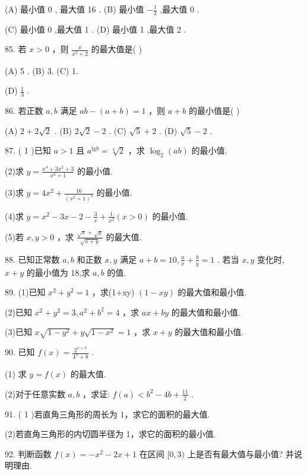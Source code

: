 \documentclass[10pt]{article}
\begin{document}
(A) 最小值 0 , 最大值 16 . (B) 最小值 \(- \frac{1}{3}\) ,最大值 0 .

(C) 最小值 0 ,最大值 1 . (D) 最小值 1 ,最大值 2 .

85. 若 \(x > 0\) ，则 \(\frac{x}{{x}^{3} + 2}\) 的最大值是( )

(A) 5 . (B) 3. (C) 1.

(D) \(\frac{1}{3}\) .

86. 若正数 \(a,b\) 满足 \({ab} - \left( {a + b}\right)  = 1\) ，则 \(a + b\) 的最小值是( )

(A) \(2 + 2\sqrt{2}\) . (B) \(2\sqrt{2} - 2\) . (C) \(\sqrt{5} + 2\) . (D) \(\sqrt{5} - 2\) .

87. ( 1 )已知 \(a > 1\) 且 \({a}^{\mathrm{{lg}}b} = \sqrt[4]{2}\) ，求 \({\log }_{2}\left( {ab}\right)\) 的最小值.

(2)求 \(y = \frac{{x}^{4} + 3{x}^{2} + 3}{{x}^{2} + 1}\) 的最小值.

(3)求 \(y = 4{x}^{2} + \frac{16}{{\left( {x}^{2} + 1\right) }^{2}}\) 的最小值.

(4)求 \(y = {x}^{2} - {3x} - 2 - \frac{3}{x} + \frac{1}{{x}^{2}}\left( {x > 0}\right)\) 的最小值.

(5)若 \(x,y > 0\) ，求 \(\frac{\sqrt{x} + \sqrt{y}}{\sqrt{x + y}}\) 的最大值.

88. 已知正常数 \(a,b\) 和正数 \(x,y\) 满足 \(a + b = {10},\frac{a}{x} + \frac{b}{y} = 1\) . 若当 \(x,y\) 变化时, \(x + y\) 的最小值为 18,求 \(a,b\) 的值.

89. (1)已知 \({x}^{2} + {y}^{2} = 1\) ，求(1+xy) \(\left( {1 - {xy}}\right)\) 的最大值和最小值.

(2)已知 \({x}^{2} + {y}^{2} = 3,{a}^{2} + {b}^{2} = 4\) ，求 \({ax} + {by}\) 的最大值和最小值.

(3)已知 \(x\sqrt{1 - {y}^{2}} + y\sqrt{1 - {x}^{2}} = 1\) ，求 \(x + y\) 的最大值和最小值.

90. 已知 \(f\left( x\right)  = \frac{{2}^{x + 3}}{{4}^{x} + 8}\) .

(1) 求 \(y = f\left( x\right)\) 的最大值.

(2)对于任意实数 \(a,b\) ，求证: \(f\left( a\right)  < {b}^{2} - {4b} + \frac{11}{2}\) .

91. ( 1 )若直角三角形的周长为 1，求它的面积的最大值.

(2)若直角三角形的内切圆半径为 1，求它的面积的最小值.

92. 判断函数 \(f\left( x\right)  =  - {x}^{2} - {2x} + 1\) 在区间 \(\lbrack 0,3)\) 上是否有最大值与最小值? 并说明理由.
\end{document}
